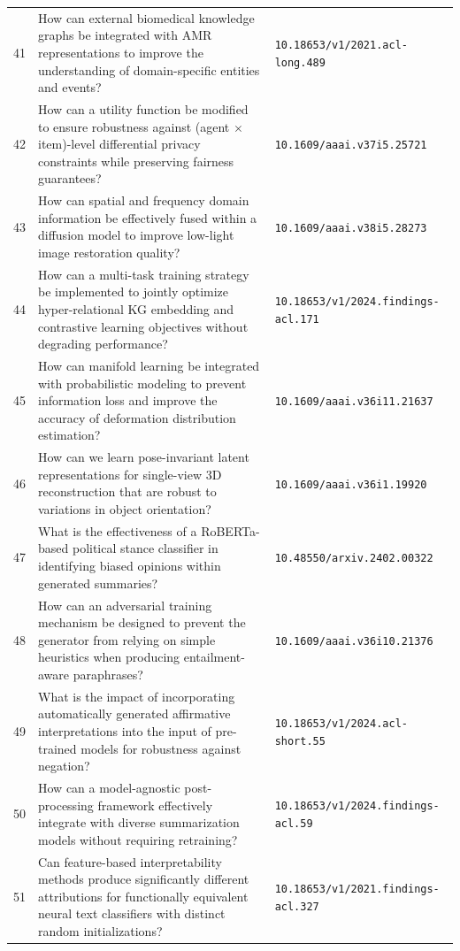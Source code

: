 \documentclass[runningheads]{llncs}
\begin{document}
\begin{longtable}{@{}p{0.5cm}p{7.2cm}p{2.5cm}@{}}
41 & How can external biomedical knowledge graphs be integrated with AMR representations to improve the understanding of domain-specific entities and events? & \texttt{10.18653/v1/2021.acl-long.489} \\
42 & How can a utility function be modified to ensure robustness against (agent $\times$ item)-level differential privacy constraints while preserving fairness guarantees? & \texttt{10.1609/aaai.v37i5.25721} \\
43 & How can spatial and frequency domain information be effectively fused within a diffusion model to improve low-light image restoration quality? & \texttt{10.1609/aaai.v38i5.28273} \\
44 & How can a multi-task training strategy be implemented to jointly optimize hyper-relational KG embedding and contrastive learning objectives without degrading performance? & \texttt{10.18653/v1/2024.findings-acl.171} \\
45 & How can manifold learning be integrated with probabilistic modeling to prevent information loss and improve the accuracy of deformation distribution estimation? & \texttt{10.1609/aaai.v36i11.21637} \\
46 & How can we learn pose-invariant latent representations for single-view 3D reconstruction that are robust to variations in object orientation? & \texttt{10.1609/aaai.v36i1.19920} \\
47 & What is the effectiveness of a RoBERTa-based political stance classifier in identifying biased opinions within generated summaries? & \texttt{10.48550/arxiv.2402.00322} \\
48 & How can an adversarial training mechanism be designed to prevent the generator from relying on simple heuristics when producing entailment-aware paraphrases? & \texttt{10.1609/aaai.v36i10.21376} \\
49 & What is the impact of incorporating automatically generated affirmative interpretations into the input of pre-trained models for robustness against negation? & \texttt{10.18653/v1/2024.acl-short.55} \\
50 & How can a model-agnostic post-processing framework effectively integrate with diverse summarization models without requiring retraining? & \texttt{10.18653/v1/2024.findings-acl.59} \\
51 & Can feature-based interpretability methods produce significantly different attributions for functionally equivalent neural text classifiers with distinct random initializations? & \texttt{10.18653/v1/2021.findings-acl.327} \\

\end{longtable}
\end{document}
